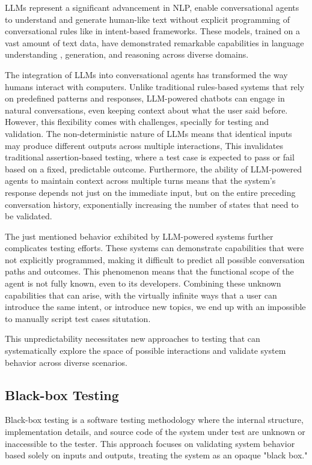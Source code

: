 \aclp{LLM} represent a significant advancement in \acl{NLP},
enable conversational agents to understand and generate human-like text
without explicit programming of conversational rules like in intent-based frameworks.
These models, trained on a vast amount of text data,
have demonstrated remarkable capabilities in
language understanding \autocite{liEnhancingNaturalLanguage2024}, generation, and reasoning across diverse domains.

The integration of \acp{LLM} into conversational agents
has transformed the way humans interact with computers.
Unlike traditional rules-based systems that rely on predefined patterns and responses,
\ac{LLM}-powered chatbots can engage in natural conversations,
even keeping context about what the user said before.
However, this flexibility comes with challenges,
specially for testing and validation.
The non-deterministic nature of \acp{LLM} means that
identical inputs may produce different outputs across multiple interactions,
This invalidates traditional assertion-based testing,
where a test case is expected to pass or fail based on a fixed, predictable outcome.
Furthermore, the ability of \ac{LLM}-powered agents
to maintain context across multiple turns
means that the system's response depends not just on the immediate input,
but on the entire preceding conversation history,
exponentially increasing the number of states that need to be validated.

The just mentioned behavior exhibited by \ac{LLM}-powered systems
further complicates testing efforts.
These systems can demonstrate capabilities that were not explicitly programmed,
making it difficult to predict all possible conversation paths and outcomes.
This phenomenon means that the functional scope of the agent is not fully known,
even to its developers.
Combining these unknown capabilities that can arise,
with the virtually infinite ways that a user can introduce the same intent,
or introduce new topics,
we end up with an impossible to manually script test cases situtation.


This unpredictability necessitates new approaches to testing
that can systematically explore the space of possible interactions
and validate system behavior across diverse scenarios.

\subsection{Black-box Testing}

Black-box testing is a software testing methodology
where the internal structure, implementation details, and source code of the system under test
are unknown or inaccessible to the tester.
This approach focuses on validating system behavior based solely on inputs and outputs,
treating the system as an opaque "black box."

